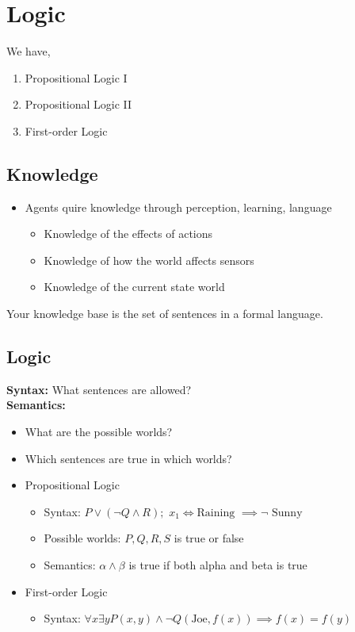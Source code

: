 \chapter{Logic}
We have, 
\begin{enumerate}
    \item Propositional Logic I
    \item Propositional Logic II
    \item First-order Logic
\end{enumerate}


\section{Knowledge}
\begin{itemize}
    \item Agents quire knowledge through perception, learning, language
        \begin{itemize}
            \item Knowledge of the effects of actions
            \item Knowledge of how the world affects sensors
            \item Knowledge of the current state world
        \end{itemize}
\end{itemize}

Your knowledge base is the set of sentences in a formal language.

\section{Logic}
\textbf{Syntax: }  What sentences are allowed?\\
\textbf{Semantics: } 
\begin{itemize}
    \item What are the possible worlds?
    \item Which sentences are true in which worlds?
\end{itemize}


\begin{itemize}
    \item Propositional Logic
        \begin{itemize}
            \item Syntax: $P \vee (\neg Q \wedge R);$ \quad  $x_1 \iff \text{Raining $\implies \neg$ Sunny}$ 
            \item Possible worlds: $P,Q,R,S$ is true or false 
            \item  Semantics: $\alpha \wedge \beta$ is true if both alpha and beta is true
        \end{itemize}
    \item First-order Logic
        \begin{itemize}
            \item Syntax: $\forall x \exists y P(x,y) \wedge \neg Q(\text{Joe}, f(x)) \implies f(x) = f(y)$
        \end{itemize}
\end{itemize}



